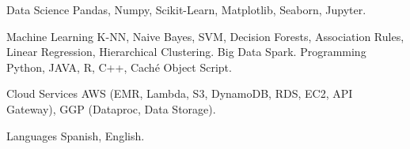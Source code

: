 

\begin{cvskills}

  \cvskill
    {Data Science} %
    {Pandas, Numpy, Scikit-Learn, Matplotlib, Seaborn, Jupyter.} %

  \cvskill
    {Machine Learning} %
    {K-NN, Naive Bayes, SVM, Decision Forests, Association Rules, Linear Regression, Hierarchical Clustering.} %
  \cvskill
    {Big Data} %
    {Spark.} %
  \cvskill
    {Programming} %
    {Python, JAVA, R, C++, Caché Object Script.} %

  \cvskill
    {Cloud Services} %
    {AWS (EMR, Lambda, S3, DynamoDB, RDS, EC2, API Gateway), GGP (Dataproc, Data Storage).} %

  \cvskill
    {Languages} %
    {Spanish, English.} %
\end{cvskills}